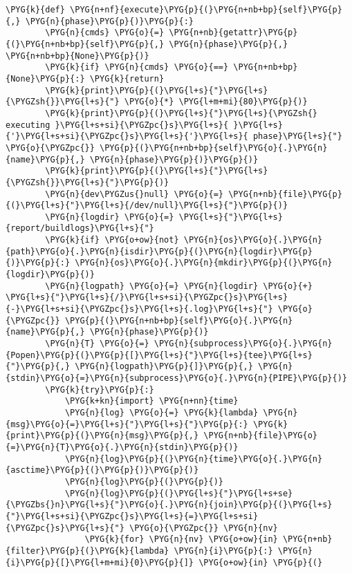 \begin{Verbatim}[commandchars=\\\{\}]
    \PYG{k}{def} \PYG{n+nf}{execute}\PYG{p}{(}\PYG{n+nb+bp}{self}\PYG{p}{,} \PYG{n}{phase}\PYG{p}{)}\PYG{p}{:}
        \PYG{n}{cmds} \PYG{o}{=} \PYG{n+nb}{getattr}\PYG{p}{(}\PYG{n+nb+bp}{self}\PYG{p}{,} \PYG{n}{phase}\PYG{p}{,} \PYG{n+nb+bp}{None}\PYG{p}{)}
        \PYG{k}{if} \PYG{n}{cmds} \PYG{o}{==} \PYG{n+nb+bp}{None}\PYG{p}{:} \PYG{k}{return}
        \PYG{k}{print}\PYG{p}{(}\PYG{l+s}{"}\PYG{l+s}{\PYGZsh{}}\PYG{l+s}{"} \PYG{o}{*} \PYG{l+m+mi}{80}\PYG{p}{)}
        \PYG{k}{print}\PYG{p}{(}\PYG{l+s}{"}\PYG{l+s}{\PYGZsh{} executing }\PYG{l+s+si}{\PYGZpc{}s}\PYG{l+s}{ }\PYG{l+s}{'}\PYG{l+s+si}{\PYGZpc{}s}\PYG{l+s}{'}\PYG{l+s}{ phase}\PYG{l+s}{"} \PYG{o}{\PYGZpc{}} \PYG{p}{(}\PYG{n+nb+bp}{self}\PYG{o}{.}\PYG{n}{name}\PYG{p}{,} \PYG{n}{phase}\PYG{p}{)}\PYG{p}{)}
        \PYG{k}{print}\PYG{p}{(}\PYG{l+s}{"}\PYG{l+s}{\PYGZsh{}}\PYG{l+s}{"}\PYG{p}{)}
        \PYG{n}{dev\PYGZus{}null} \PYG{o}{=} \PYG{n+nb}{file}\PYG{p}{(}\PYG{l+s}{"}\PYG{l+s}{/dev/null}\PYG{l+s}{"}\PYG{p}{)}
        \PYG{n}{logdir} \PYG{o}{=} \PYG{l+s}{"}\PYG{l+s}{report/buildlogs}\PYG{l+s}{"}
        \PYG{k}{if} \PYG{o+ow}{not} \PYG{n}{os}\PYG{o}{.}\PYG{n}{path}\PYG{o}{.}\PYG{n}{isdir}\PYG{p}{(}\PYG{n}{logdir}\PYG{p}{)}\PYG{p}{:} \PYG{n}{os}\PYG{o}{.}\PYG{n}{mkdir}\PYG{p}{(}\PYG{n}{logdir}\PYG{p}{)}
        \PYG{n}{logpath} \PYG{o}{=} \PYG{n}{logdir} \PYG{o}{+} \PYG{l+s}{"}\PYG{l+s}{/}\PYG{l+s+si}{\PYGZpc{}s}\PYG{l+s}{-}\PYG{l+s+si}{\PYGZpc{}s}\PYG{l+s}{.log}\PYG{l+s}{"} \PYG{o}{\PYGZpc{}} \PYG{p}{(}\PYG{n+nb+bp}{self}\PYG{o}{.}\PYG{n}{name}\PYG{p}{,} \PYG{n}{phase}\PYG{p}{)}
        \PYG{n}{T} \PYG{o}{=} \PYG{n}{subprocess}\PYG{o}{.}\PYG{n}{Popen}\PYG{p}{(}\PYG{p}{[}\PYG{l+s}{"}\PYG{l+s}{tee}\PYG{l+s}{"}\PYG{p}{,} \PYG{n}{logpath}\PYG{p}{]}\PYG{p}{,} \PYG{n}{stdin}\PYG{o}{=}\PYG{n}{subprocess}\PYG{o}{.}\PYG{n}{PIPE}\PYG{p}{)}
        \PYG{k}{try}\PYG{p}{:}
            \PYG{k+kn}{import} \PYG{n+nn}{time}
            \PYG{n}{log} \PYG{o}{=} \PYG{k}{lambda} \PYG{n}{msg}\PYG{o}{=}\PYG{l+s}{"}\PYG{l+s}{"}\PYG{p}{:} \PYG{k}{print}\PYG{p}{(}\PYG{n}{msg}\PYG{p}{,} \PYG{n+nb}{file}\PYG{o}{=}\PYG{n}{T}\PYG{o}{.}\PYG{n}{stdin}\PYG{p}{)}
            \PYG{n}{log}\PYG{p}{(}\PYG{n}{time}\PYG{o}{.}\PYG{n}{asctime}\PYG{p}{(}\PYG{p}{)}\PYG{p}{)}
            \PYG{n}{log}\PYG{p}{(}\PYG{p}{)}
            \PYG{n}{log}\PYG{p}{(}\PYG{l+s}{"}\PYG{l+s+se}{\PYGZbs{}n}\PYG{l+s}{"}\PYG{o}{.}\PYG{n}{join}\PYG{p}{(}\PYG{l+s}{"}\PYG{l+s+si}{\PYGZpc{}s}\PYG{l+s}{=}\PYG{l+s+si}{\PYGZpc{}s}\PYG{l+s}{"} \PYG{o}{\PYGZpc{}} \PYG{n}{nv}
                \PYG{k}{for} \PYG{n}{nv} \PYG{o+ow}{in} \PYG{n+nb}{filter}\PYG{p}{(}\PYG{k}{lambda} \PYG{n}{i}\PYG{p}{:} \PYG{n}{i}\PYG{p}{[}\PYG{l+m+mi}{0}\PYG{p}{]} \PYG{o+ow}{in} \PYG{p}{(}

\end{Verbatim}

